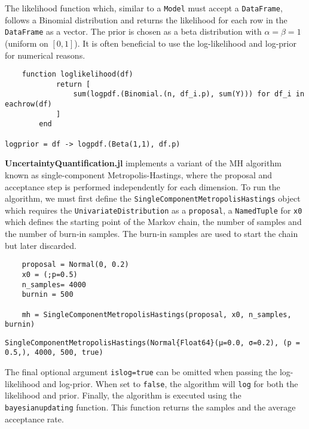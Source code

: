 The likelihood function which, similar to a \texttt{Model} must accept a \texttt{DataFrame}, follows a Binomial distribution and returns the likelihood for each row in the \texttt{DataFrame} as a vector. The prior is chosen as a beta distribution with \(\alpha=\beta=1\) (uniform on \([0, 1]\)). It is often beneficial to use the log-likelihood and log-prior for numerical reasons.




\begin{verbatim}
    function loglikelihood(df)
            return [
                sum(logpdf.(Binomial.(n, df_i.p), sum(Y))) for df_i in eachrow(df)
            ]
        end

logprior = df -> logpdf.(Beta(1,1), df.p)
\end{verbatim}



\textbf{UncertaintyQuantification.jl} implements a variant of the MH algorithm known as single-component Metropolis-Hastings, where the proposal and acceptance step is performed independently for each dimension. To run the algorithm, we must first define the \texttt{SingleComponentMetropolisHastings} object which requires the \texttt{UnivariateDistribution} as a \texttt{proposal}, a \texttt{NamedTuple} for \texttt{x0} which defines the starting point of the Markov chain, the number of samples and the number of burn-in samples. The burn-in samples are used to start the chain but later discarded.




\begin{verbatim}
    proposal = Normal(0, 0.2)
    x0 = (;p=0.5)
    n_samples= 4000
    burnin = 500

    mh = SingleComponentMetropolisHastings(proposal, x0, n_samples, burnin)
\end{verbatim}


\begin{verbatim}
SingleComponentMetropolisHastings(Normal{Float64}(μ=0.0, σ=0.2), (p = 0.5,), 4000, 500, true)
\end{verbatim}



The final optional argument \texttt{islog=true} can be omitted when passing the log-likelihood and log-prior. When set to \texttt{false}, the algorithm will \texttt{log} for both the likelihood and prior. Finally, the algorithm is executed using the \texttt{bayesianupdating} function. This function returns the samples and the average acceptance rate.




